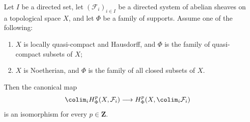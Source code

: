 \begin{lemma}
\label{lemma-family-supports-colimit}
\begin{reference}
\cite[Chapter III, \S 3.6, Proposition 3.6.3, p. 170]{Tohoku}
\end{reference}
Let $I$ be a directed set, let $(\mathcal{F}_i)_{i \in I}$ be a directed
system of abelian sheaves on a topological space $X$, and let $\Phi$ be a
family of supports. Assume one of the following:
\begin{enumerate}
\item $X$ is locally quasi-compact and Hausdorff, and $\Phi$ is the family
of quasi-compact subsets of $X$;
\item $X$ is Noetherian, and $\Phi$ is the family of all closed subsets of
$X$.
\end{enumerate}
Then the canonical map
$$
\colim_i H^p_\Phi(X, \mathcal{F}_i)
\longrightarrow
H^p_\Phi(X, \colim_i \mathcal{F}_i)
$$
is an isomorphism for every $p \in \mathbf{Z}$.
\end{lemma}

